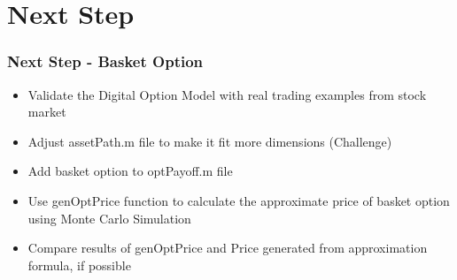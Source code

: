 \documentclass[10pt,Compress]{beamer}
\begin{document}
\section{Next Step}
\begin{frame}
\frametitle{Next Step - Basket Option}
\begin{itemize}
\item Validate the Digital Option Model with real trading examples from stock market
\item Adjust assetPath.m file to make it fit more dimensions (Challenge)
\item Add basket option to optPayoff.m file
\item Use genOptPrice function to calculate the approximate price of basket option using Monte Carlo Simulation
\item Compare results of genOptPrice and Price generated from approximation formula, if possible
\end{itemize}
\end{frame}
\end{document}
